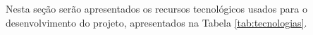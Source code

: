 %
%
%
%
%
%



Nesta seção serão apresentados os recursos tecnológicos usados para o desenvolvimento do projeto, apresentados na Tabela \ref{tab:tecnologias}.

